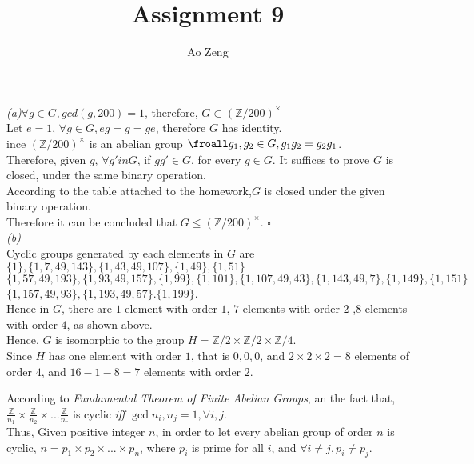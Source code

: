 \documentclass[11pt]{article}
\newenvironment{problem}[2][Problem]{\begin{trivlist}
\item[\hskip \labelsep {\bfseries #1}\hskip \labelsep {\bfseries #2.}]}{\end{trivlist}}
\begin{document}
\title{Assignment 9}
\author{Ao Zeng}
\maketitle
\begin{problem}{1}
\textit{(a)}$\forall g \in G, gcd(g,200) =1$, therefore, $G \subset (\mathbb{Z}/200)^{\times}$\\
Let $ e = 1$, $\forall g \in G, eg = g = ge$, therefore $G$ has identity.\\
ince $(\mathbb{Z}/200)^{\times}$ is an abelian group $\froall g_1,g_2 \in G, g_1 g_2 = g_2 g_1$.\\
Therefore, given $g$, $\forall g' in G$, if $g g' \in G$, for every $g \in G$. It suffices to prove $G$ is closed, under the same binary operation.\\
According to the table attached to the homework,$G$ is closed under the given binary operation.\\
Therefore it can be concluded that $G \leq (\mathbb{Z}/200)^{\times}$. $\square$\\
\textit{(b)}\\
Cyclic groups generated by each elements in $G$ are $\{1\},\{1, 7, 49, 143\}, \{1, 43, 49, 107\},  \{1,49\}, \{ 1, 51 \}$\\
$\{1, 57, 49, 193\}, \{ 1, 93, 49, 157\}, \{ 1, 99\}, \{ 1, 101\}, \{1, 107, 49, 43\},\{1, 143, 49, 7\},\{ 1, 149\}, \{1, 151\}$\\
$\{1, 157,49,  93\}, \{1, 193 ,49 , 57\}. \{1,199\}$.\\
Hence in $G$, there are $1$ element with order $1$, $7$ elements with order $2$ ,$8$ elements with order $4$, as shown above.\\
Hence, $G$ is isomorphic to the group $H = \mathbb{Z}/2 \times \mathbb{Z}/2 \times \mathbb{Z}/4$.\\
Since $H$ has one element with order $1$, that is ${0,0,0}$, and $2\times 2 \times 2 = 8$ elements of order $4$, and $16-1-8 = 7$ elements with order $2$.\\
\end{problem}

\begin{problem}{2}
According to \textit{Fundamental Theorem of Finite Abelian Groups}, an the fact that, $\frac{\mathbb{Z}}{n_1} \times \frac{\mathbb{Z}}{n_2} \times... \frac{\mathbb{Z}}{n_r}$ is cyclic \textit{iff} $\gcd{n_i,n_j} = 1, \forall i,j$.\\
Thus, Given positive integer $n$, in order to let every abelian group of order $n$ is cyclic, $n = p_1 \times p_2 \times ... \times p_n$, where $p_i$ is prime for all $i$, and $\forall i \neq j,p_i \neq p_j$.
\end{problem}
\end{document}
